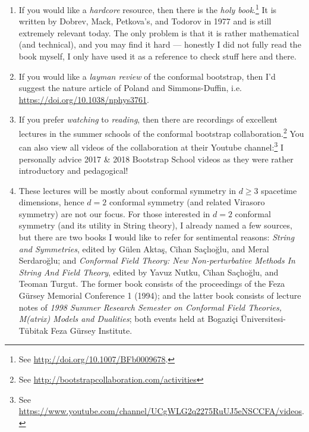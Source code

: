 \documentclass[12pt]{article}
\numberwithin{equation}{section}
\begin{document}
\begin{enumerate}
	\item If you would like a \emph{hardcore} resource, then there is the \emph{holy book}.\footnote{See \hyperref{http://doi.org/10.1007/BFb0009678}{}{}{http://doi.org/10.1007/BFb0009678}.} It is written by Dobrev, Mack, Petkova's, and Todorov in 1977 and is still extremely relevant today. The only problem is that it is rather mathematical (and technical), and you may find it hard --- honestly I did not fully read the book myself, I only have used it as a reference to check stuff here and there. 
	\item If you would like a \emph{layman review} of the conformal bootstrap, then I'd suggest the nature article of Poland and Simmons-Duffin, i.e. \hyperref{https://doi.org/10.1038/nphys3761}{}{}{https://doi.org/10.1038/nphys3761}.
	
	\item If you prefer \emph{watching} to \emph{reading}, then there are recordings of excellent lectures in the summer schools of the conformal bootstrap collaboration.\footnote{See \hyperref{http://bootstrapcollaboration.com/activities}{}{}{http://bootstrapcollaboration.com/activities}} You can also view all videos of the collaboration at their Youtube channel:\footnote{See \hyperref{https://www.youtube.com/channel/UCgWLG2q2275RuUJ5eNSCCFA/videos}{}{}{https://www.youtube.com/channel/UCgWLG2q2275RuUJ5eNSCCFA/videos}.} I personally advice 2017 \& 2018 Bootstrap School videos as they were rather introductory and pedagogical!
	
	\item These lectures will be mostly about conformal symmetry in $d\ge 3$ spacetime dimensions, hence $d=2$ conformal symmetry (and related Virasoro symmetry) are not our focus. For those interested in $d=2$ conformal symmetry (and its utility in String theory), I already named a few sources, but there are two books I would like to refer for sentimental reasons:  \emph{String and Symmetries}, edited by Gülen Aktaş, Cihan Saçlıoğlu, and Meral Serdaroğlu; and \emph{Conformal Field Theory: New Non-perturbative Methods In String And Field Theory}, edited by Yavuz Nutku, Cihan Saçlıoğlu, and Teoman Turgut. The former book consists of the proceedings of the Feza Gürsey Memorial Conference 1 (1994); and the latter book consists of lecture notes of  \emph{1998 Summer Research Semester on Conformal Field Theories, M(atrix) Models and Dualities}; both events held at Bogaziçi Üniversitesi-Tübitak Feza Gürsey Institute.
	

\end{enumerate}
\end{document}
